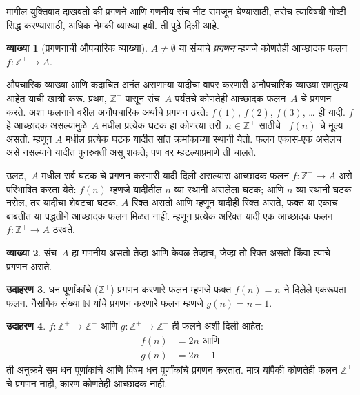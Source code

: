 \documentclass[11pt,a4paper,openany]{book}
\theoremstyle{definition}
\newtheorem{defn}{व्याख्या}[section]
\newtheorem{ex}[defn]{उदाहरण}
\newenvironment{explain}{}{}
\newcommand{\Nat}{\mathbb{N}}
\newcommand{\PosInt}{\mathbb{Z}^{+}}
\begin{document}
मागील युक्तिवाद दाखवतो की प्रगणने आणि गणनीय संच नीट
समजून घेण्यासाठी, तसेच त्यांविषयी गोष्टी सिद्ध करण्यासाठी,
अधिक नेमकी व्याख्या हवी. ती पुढे दिली आहे.

\begin{defn}[प्रगणनाची औपचारिक व्याख्या]
$A \neq \emptyset$ या संचाचे \emph{प्रगणन} म्हणजे कोणतेही
आच्छादक फलन $f \colon \PosInt \to A$.
\end{defn}

\begin{explain}
औपचारिक व्याख्या आणि कदाचित अनंत असणाऱ्या यादीचा वापर करणारी
अनौपचारिक व्याख्या समतुल्य आहेत याची खात्री करू. प्रथम, $\PosInt$
पासून संच~$A$ पर्यंतचे कोणतेही आच्छादक फलन~$A$ चे प्रगणन करते.
अशा फलनाने वरील अनौपचारिक अर्थाचे प्रगणन ठरते: $f(1)$, $f(2)$,
$f(3)$, \dots{} ही यादी. $f$ हे आच्छादक असल्यामुळे~$A$
मधील प्रत्येक घटक हा कोणत्या तरी~$n \in \PosInt$ साठीचे
~$f(n)$ चे मूल्य असतो. म्हणून $A$ मधील प्रत्येक घटक यादीत
सांत क्रमांकाच्या स्थानी येतो. फलन एकास-एक असेलच असे नसल्याने
यादीत पुनरुक्ती असू शकते; पण वर म्हटल्याप्रमाणे ती चालते.

उलट,~$A$ मधील सर्व घटक चे प्रगणन करणारी यादी दिली असल्यास
आच्छादक फलन $f\colon \PosInt \to A$ असे परिभाषित करता येते:
$f(n)$ म्हणजे यादीतील $n$ व्या स्थानी असलेला घटक; आणि
$n$ व्या स्थानी घटक नसेल, तर यादीचा शेवटचा घटक.
$A$ रिक्त असतो आणि म्हणून यादीही रिक्त असते, फक्त या एकाच बाबतीत
या पद्धतीने आच्छादक फलन मिळत नाही. म्हणून प्रत्येक अरिक्त
यादी एक आच्छादक फलन $f\colon \PosInt \to A$ ठरवते.
\end{explain}

\begin{defn}
  \label{sfr:siz:enm:defn:enumerable}
  संच~$A$ हा गणनीय असतो तेव्हा आणि केवळ तेव्हाच,
  जेव्हा तो रिक्त असतो किंवा त्याचे प्रगणन असते.
\end{defn}

\begin{ex}
धन पूर्णांकांचे ($\PosInt$) प्रगणन करणारे फलन म्हणजे फक्त
$f(n) = n$ ने दिलेले एकरूपता फलन. नैसर्गिक संख्या $\Nat$ यांचे
प्रगणन करणारे फलन म्हणजे $g(n) = n - 1$.
\end{ex}

\begin{ex}
$f\colon \PosInt \to \PosInt$ आणि $g \colon \PosInt \to \PosInt$
ही फलने अशी दिली आहेत:
\begin{align*}
f(n) & = 2n \text{ आणि}\\
g(n) & = 2n - 1
\end{align*}
ती अनुक्रमे सम धन पूर्णांकांचे आणि विषम धन पूर्णांकांचे प्रगणन करतात.
मात्र यांपैकी कोणतेही फलन $\PosInt$ चे प्रगणन नाही, कारण कोणतेही
आच्छादक नाही.
\end{ex}
\end{document}
